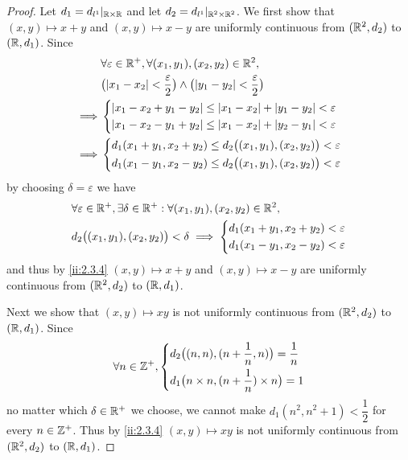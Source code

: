 \begin{proof}
  Let \(d_1 = d_{l^1}|_{\mathbb{R} \times \mathbb{R}}\) and let \(d_2 = d_{l^1}|_{\mathbb{R}^2 \times \mathbb{R}^2}\).
  We first show that \((x, y) \mapsto x + y\) and \((x, y) \mapsto x - y\) are uniformly continuous from \((\mathbb{R}^2, d_2)\) to \((\mathbb{R}, d_1)\).
  Since
  \begin{align*}
             & \forall \varepsilon \in \R^+, \forall (x_1, y_1), (x_2, y_2) \in \R^2,                                      \\
             & \big(\abs{x_1 - x_2} < \dfrac{\varepsilon}{2}\big) \land \big(\abs{y_1 - y_2} < \dfrac{\varepsilon}{2}\big) \\
    \implies & \begin{dcases}
                 \abs{x_1 - x_2 + y_1 - y_2} \leq \abs{x_1 - x_2} + \abs{y_1 - y_2} < \varepsilon \\
                 \abs{x_1 - x_2 - y_1 + y_2} \leq \abs{x_1 - x_2} + \abs{y_2 - y_1} < \varepsilon \\
               \end{dcases}                            \\
    \implies & \begin{dcases}
                 d_1(x_1 + y_1, x_2 + y_2) \leq d_2\big((x_1, y_1), (x_2, y_2)\big) < \varepsilon \\
                 d_1(x_1 - y_1, x_2 - y_2) \leq d_2\big((x_1, y_1), (x_2, y_2)\big) < \varepsilon
               \end{dcases}
  \end{align*}
  by choosing \(\delta = \varepsilon\) we have
  \begin{align*}
     & \forall \varepsilon \in \mathbb{R}^+, \exists \delta \in \mathbb{R}^+ : \forall (x_1, y_1), (x_2, y_2) \in \mathbb{R}^2, \\
     & d_2\big((x_1, y_1), (x_2, y_2)\big) < \delta \implies \begin{dcases}
                                                               d_1(x_1 + y_1, x_2 + y_2) < \varepsilon \\
                                                               d_1(x_1 - y_1, x_2 - y_2) < \varepsilon
                                                             \end{dcases}
  \end{align*}
  and thus by \cref{ii:2.3.4} \((x, y) \mapsto x + y\) and \((x, y) \mapsto x - y\) are uniformly continuous from \((\mathbb{R}^2, d_2)\) to \((\mathbb{R}, d_1)\).

  Next we show that \((x, y) \mapsto xy\) is not uniformly continuous from \((\mathbb{R}^2, d_2)\) to \((\mathbb{R}, d_1)\).
  Since
  \[
    \forall n \in \mathbb{Z}^+, \begin{dcases}
      d_2\big((n, n), (n + \dfrac{1}{n}, n)\big) = \dfrac{1}{n} \\
      d_1\big(n \times n, (n + \dfrac{1}{n}) \times n\big) = 1
    \end{dcases}
  \]
  no matter which \(\delta \in \mathbb{R}^+\) we choose, we cannot make \(d_1(n^2, n^2 + 1) < \dfrac{1}{2}\) for every \(n \in \mathbb{Z}^+\).
  Thus by \cref{ii:2.3.4} \((x, y) \mapsto xy\) is not uniformly continuous from \((\mathbb{R}^2, d_2)\) to \((\mathbb{R}, d_1)\).


\end{proof}
